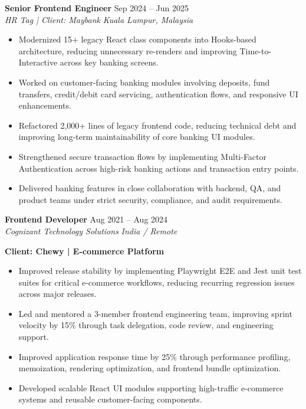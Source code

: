 \documentclass[10pt,a4paper]{article}
\newcommand{\resumeSubheading}[4]{
  \textbf{#1} \hfill #2 \\
  \textit{#3} \hfill \textit{#4}
}
\begin{document}
\vspace{4pt}

\resumeSubheading
{Senior Frontend Engineer}
{Sep 2024 -- Jun 2025}
{HR Tag | Client: Maybank}
{Kuala Lumpur, Malaysia}

\begin{itemize}
    \item Modernized 15+ legacy React class components into Hooks-based architecture, reducing unnecessary re-renders and improving Time-to-Interactive across key banking screens.
    \item Worked on customer-facing banking modules involving deposits, fund transfers, credit/debit card servicing, authentication flows, and responsive UI enhancements.
    \item Refactored 2,000+ lines of legacy frontend code, reducing technical debt and improving long-term maintainability of core banking UI modules.
    \item Strengthened secure transaction flows by implementing Multi-Factor Authentication across high-risk banking actions and transaction entry points.
    \item Delivered banking features in close collaboration with backend, QA, and product teams under strict security, compliance, and audit requirements.
\end{itemize}

\vspace{4pt}

\resumeSubheading
{Frontend Developer}
{Aug 2021 -- Aug 2024}
{Cognizant Technology Solutions}
{India / Remote}

\vspace{3pt}

\textbf{Client: Chewy | E-commerce Platform}

\begin{itemize}
    \item Improved release stability by implementing Playwright E2E and Jest unit test suites for critical e-commerce workflows, reducing recurring regression issues across major releases.
    \item Led and mentored a 3-member frontend engineering team, improving sprint velocity by 15\% through task delegation, code review, and engineering support.
    \item Improved application response time by 25\% through performance profiling, memoization, rendering optimization, and frontend bundle optimization.
    \item Developed scalable React UI modules supporting high-traffic e-commerce systems and reusable customer-facing components.
\end{itemize}
\end{document}
